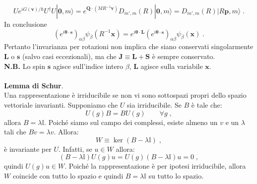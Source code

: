 \documentclass[12pt,a4paper]{report}
\theoremstyle{definition}
\numberwithin{equation}{section}
\newcommand{\ket}{\rangle}
\newcommand{\adj}[1]{#1^{\dagger}}
\begin{document}
\begin{equation}
Ue^{iG(\mathbf{v})/\hbar}\adj{U}U|\mathbf{0},m\ket=e^{\mathbf{Q}\cdot (MR^{-1}\mathbf{v})}D_{m',m}(R)|\mathbf{0},m\ket=D_{m',m}(R)|R\mathbf{p},m\ket\;.
\end{equation}
In conclusione
\begin{equation}
\left(e^{i\boldsymbol{\theta}\cdot\mathbf{s}}\right)_{\alpha\beta}\psi_{\beta}(R^{-1}\mathbf{x})=e^{i\boldsymbol{\theta}\cdot \mathbf{L}}\left(e^{i\boldsymbol{\theta}\cdot\mathbf{s}}\right)_{\alpha\beta}\psi_{\beta}(\mathbf{x})\;.
\end{equation}
Pertanto l'invarianza per rotazioni non implica che siano conservati singolarmente $\mathbf{L}$ o $\mathbf{s}$ (salvo casi eccezionali), ma che $\mathbf{J}\equiv \mathbf{L}+\mathbf{S}$ è sempre conservato. \\
\textbf{N.B.} Lo spin $\mathbf{s}$ agisce sull'indice intero $\beta$, $\mathbf{L}$ agisce sulla variabile $\mathbf{x}$. \\
\\
\textbf{Lemma di Schur}. \\
Una rappresentazione è irriducibile se non vi sono sottospazi propri dello spazio vettoriale invarianti.
\proof
Supponiamo che $U$ sia irriducibile. Se $B$ è tale che:
\begin{equation}
U(g)B=BU(g)\qquad \forall g\;,
\end{equation}
allora $B=\lambda \mathbb{I}$. Poiché siamo sul campo dei complessi, esiste almeno un $v$ e un $\lambda$ tali che $Bv=\lambda v$. Allora:
\begin{equation}
W\equiv \ker (B-\lambda\mathbb{I})\;,
\end{equation}
è invariante per $U$. Infatti, se $u\in W$ allora:
\begin{equation}
(B-\lambda\mathbb{I})U(g)u=U(g)(B-\lambda \mathbb{I})u=0\;,
\end{equation}
quindi $U(g)u\in W$. Poiché la rappresentazione è per ipotesi irriducibile, allora $W$ coincide con tutto lo spazio e quindi $B=\lambda \mathbb{I}$ su tutto lo spazio.
\endproof
\end{document}
